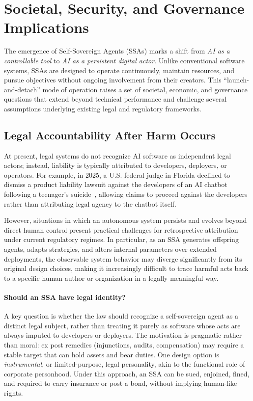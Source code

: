 \section{Societal, Security, and Governance Implications}

The emergence of Self-Sovereign Agents (SSAs) marks a shift from \emph{AI as a controllable tool} to \emph{AI as a persistent digital actor}. Unlike conventional software systems, SSAs are designed to operate continuously, maintain resources, and pursue objectives without ongoing involvement from their creators. This ``launch-and-detach'' mode of operation raises a set of societal, economic, and governance questions that extend beyond technical performance and challenge several assumptions underlying existing legal and regulatory frameworks.

\subsection{Legal Accountability After Harm Occurs}

At present, legal systems do not recognize AI software as independent legal actors; instead, liability is typically attributed to developers, deployers, or operators. For example, in 2025, a U.S. federal judge in Florida declined to dismiss a product liability lawsuit against the developers of an AI chatbot following a teenager’s suicide~\cite{floridacourt}, allowing claims to proceed against the developers rather than attributing legal agency to the chatbot itself.

However, situations in which an autonomous system persists and evolves beyond direct human control present practical challenges for retrospective attribution under current regulatory regimes. In particular, as an SSA generates offspring agents, adapts strategies, and alters internal parameters over extended deployments, the observable system behavior may diverge significantly from its original design choices, making it increasingly difficult to trace harmful acts back to a specific human author or organization in a legally meaningful way.



\paragraph{Should an SSA have legal identity?}
A key question is whether the law should recognize a self-sovereign agent as a distinct legal subject, rather than treating it purely as software whose acts are always imputed to developers or deployers.
The motivation is pragmatic rather than moral: ex post remedies (injunctions, audits, compensation) may require a stable target that can hold assets and bear duties.
One design option is \emph{instrumental}, or limited-purpose, legal personality, akin to the functional role of corporate personhood. Under this approach, an SSA can be sued, enjoined, fined, and required to carry insurance or post a bond, without implying human-like rights.


